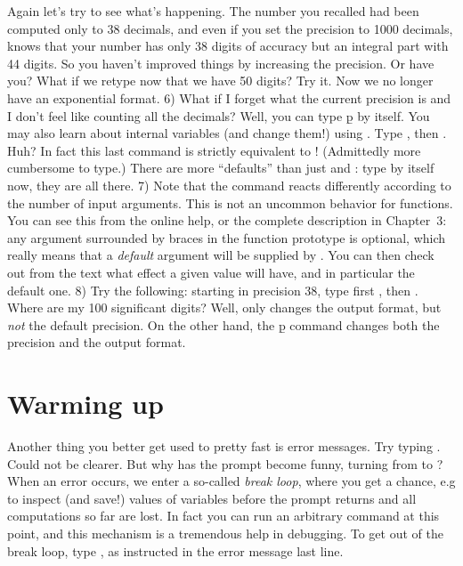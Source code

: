 Again let's try to see what's happening. The number you recalled had been
computed only to 38 decimals, and even if you set the precision to 1000
decimals,  knows that your number has only 38 digits of accuracy but
an integral part with 44 digits. So you haven't improved things by increasing
the precision. Or have you? What if we retype  now that we
have 50 digits? Try it. Now we no longer have an exponential format.
\medskip
%
6) What if I forget what the current precision is and I don't feel like
counting all the decimals? Well, you can type \b{p} by itself. You may also
learn about  internal variables (and change them!) using
. Type , then
. Huh? In fact this last command is strictly
equivalent to ! (Admittedly more cumbersome to type.) There are
more ``defaults'' than just  and : type
 by itself now, they are all there. \smallskip
%
7) Note that the  command reacts differently according to the
number of input arguments. This is not an uncommon behavior for 
functions. You can see this from the online help, or the complete description
in Chapter~3: any argument surrounded by braces \kbd{\obr\cbr} in the
function prototype is optional, which really means that a \emph{default}
argument will be supplied by . You can then check out from the text
what effect a given value will have, and in particular the default one.
\smallskip
%
8) Try the following: starting in precision 38, type first
, then . Where are my 100
significant digits? Well,  only changes the output
format, but \emph{not} the default precision. On the other hand, the \b{p}
command changes both the precision and the output format.

\section{Warming up}

Another thing you better get used to pretty fast is error messages. Try
typing . Could not be clearer. But why has the prompt
become funny, turning from  to  ? When an error occurs, we
enter a so-called \emph{break loop}, where you get a chance, e.g to inspect
(and save!) values of variables before the prompt returns and all
computations so far are lost. In fact you can run an arbitrary command at
this point, and this mechanism is a tremendous help in debugging. To get out
of the break loop, type , as instructed in the error message
last line.

